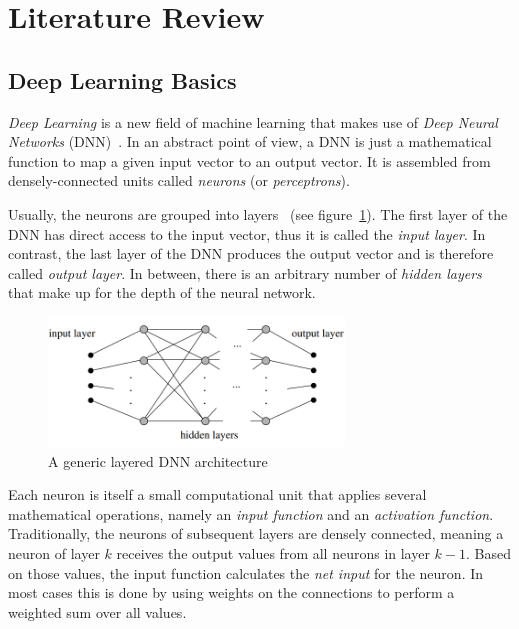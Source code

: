 \section{Literature Review}

\subsection{Deep Learning Basics}
\emph{Deep Learning} is a new field of machine learning that makes use of \emph{Deep Neural Networks} (DNN)~\cite[pp.~125f]{nn_intro96}. In an abstract point of view, a DNN is just a mathematical function to map a given input vector to an output vector. It is assembled from densely-connected units called \emph{neurons} (or \emph{perceptrons}).

Usually, the neurons are grouped into layers~\cite[p.~125]{nn_intro96} (see figure~\ref{fig:layered_architecture}). The first layer of the DNN has direct access to the input vector, thus it is called the \emph{input layer}. In contrast, the last layer of the DNN produces the output vector and is therefore called \emph{output layer}. In between, there is an arbitrary number of \emph{hidden layers} that make up for the depth of the neural network.

\begin{figure}[h]
    \centering
    \includegraphics[width=0.7\textwidth]{images/generic_layered_architecture}
    \caption{A generic layered DNN architecture~\cite[p.~126]{nn_intro96}}
    \label{fig:layered_architecture}
\end{figure}

Each neuron is itself a small computational unit that applies several mathematical operations, namely an \emph{input function} and an \emph{activation function}. Traditionally, the neurons of subsequent layers are densely connected, meaning a neuron of layer $k$ receives the output values from all neurons in layer $k-1$. Based on those values, the input function calculates the \emph{net input} for the neuron. In most cases this is done by using weights on the connections to perform a weighted sum over all values.

